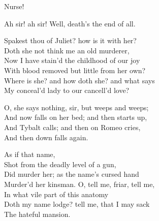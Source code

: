 \begin{speech}
Nurse! \\
\end{speech}
\begin{speech}
Ah sir! ah sir!   Well, death's the end of all.
\\
\end{speech}
\begin{speech}
Spakest thou of Juliet? how is it with her? \\
Doth she not think me an old murderer, \\
Now I have stain'd the childhood of our joy \\
With blood removed but little from her own? \\
Where is she? and how doth she? and what says \\
My conceal'd lady to our cancell'd love? \\
\end{speech}
\begin{speech}
O, she says nothing, sir, but weeps and weeps; \\

And now falls on her bed; and then starts up, \\
And Tybalt calls; and then on Romeo cries, \\
And then down falls again. \\
\end{speech}
\begin{speech}
As if that name, \\
Shot from the deadly level of a gun, \\
Did murder her; as the name's cursed hand \\
Murder'd her kinsman. O, tell me, friar, tell me, \\
In what vile part of this anatomy \\
Doth my name lodge? tell me, that I may sack \\
The hateful mansion.  \\
\end{speech}
